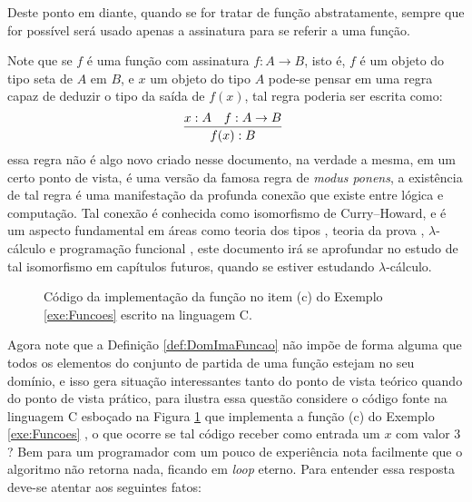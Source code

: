 \begin{atencao}
  Deste ponto em diante, quando se for tratar de função abstratamente, sempre que for possível será usado apenas a assinatura para se referir a uma função.
\end{atencao}

Note que se $f$ é uma função com assinatura $f: A \rightarrow B$, isto é, $f$ é um objeto do tipo seta de $A$ em $B$, e $x$ um objeto do tipo $A$ pode-se pensar em uma regra capaz de deduzir o tipo da saída de $f(x)$, tal regra poderia ser escrita como:
\begin{equation*}
	\infer[ ]{f(x):B}{x:A & f:A \rightarrow B}
\end{equation*}
essa regra não é algo novo criado nesse documento, na verdade a mesma, em um certo ponto de vista, é uma versão da famosa regra de \textit{modus ponens}, a existência de tal regra é uma manifestação da profunda conexão que existe entre lógica e computação. Tal conexão é conhecida como isomorfismo de Curry–Howard, e é um aspecto fundamental em áreas como teoria dos tipos \cite{nederpelt2014, thompson1999}, teoria da prova \cite{nederpelt2014, sergey2014}, $\lambda$-cálculo \cite{bare1984, henk1992, bimbo2019} e programação funcional \cite{thompson1999, fmcbook}, este documento irá se aprofundar no estudo de tal isomorfismo em capítulos futuros, quando se estiver estudando $\lambda$-cálculo.

\begin{figure}[h]
	
	\caption{Código da implementação da função no item (c) do Exemplo \ref{exe:Funcoes} escrito na linguagem C.}
	\label{fig:FuncaoSqrt}
\end{figure}

Agora note que a Definição \ref{def:DomImaFuncao} não impõe de forma alguma que todos os elementos do conjunto de partida de uma função estejam no seu domínio, e isso gera situação interessantes tanto do ponto de vista teórico quando do ponto de vista prático, para ilustra essa questão considere o código fonte na linguagem C esboçado na Figura \ref{fig:FuncaoSqrt} que implementa a função (c) do Exemplo \ref{exe:Funcoes} , o que ocorre se tal código receber como entrada um $x$ com valor $3$? Bem para um programador com um pouco de experiência nota facilmente que o algoritmo não retorna nada, ficando em \textit{loop} eterno. Para entender essa resposta deve-se atentar aos seguintes fatos:

